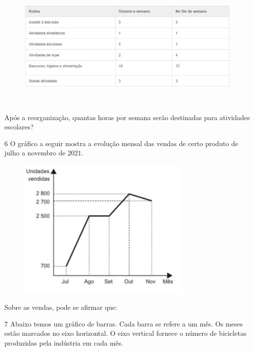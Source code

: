 \begin{figure}[h]
\centering\includegraphics[width=5.90556in,height=2.41638in]{./imgSAEB_6_MAT/media/image83.png}
\end{figure}

Após a reorganização, quantas horas por semana serão destinadas para
atividades escolares?


\num{6}  O gráfico a seguir mostra a evolução mensal das vendas de certo
produto de julho a novembro de $2021$.

\begin{figure}[h]
\centering\includegraphics[width=3.36458in,height=2.73558in]{./imgSAEB_6_MAT/media/image84.png}
\end{figure}

Sobre as vendas, pode se afirmar que:


\num{7}  Abaixo temos um gráfico de barras. Cada barra se refere a um mês. Os
meses estão marcados no eixo horizontal. O eixo vertical fornece o
número de bicicletas produzidas pela indústria em cada mês.

